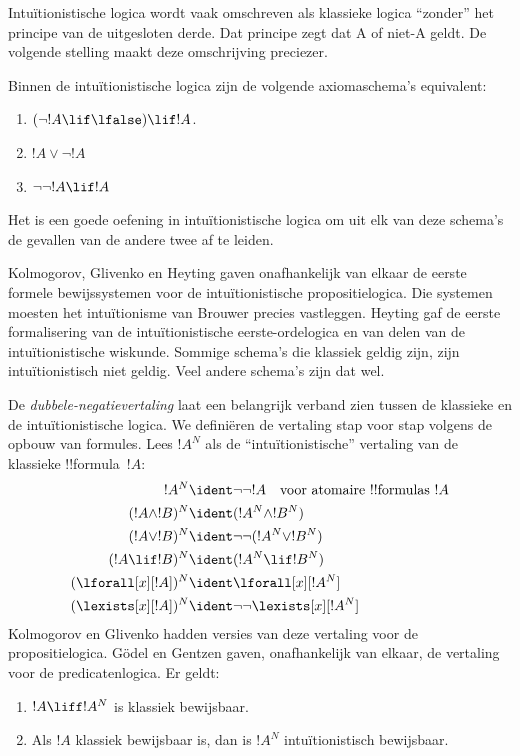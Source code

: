 \documentclass[../../../include/open-logic-section]{subfiles}
\begin{document}
Intuïtionistische logica wordt vaak omschreven als klassieke logica ``zonder''
het principe van de uitgesloten derde. Dat principe zegt dat A of niet-A geldt.
De volgende stelling maakt deze omschrijving preciezer.
\begin{thm}
Binnen de intuïtionistische logica zijn de volgende axiomaschema's equivalent:
\begin{enumerate}
\item $(\lnot !A \lif \lfalse) \lif !A$.
\item $!A \lor \lnot !A$
\item $\lnot \lnot !A \lif !A$
\end{enumerate}
\end{thm}
Het is een goede oefening in intuïtionistische logica om uit elk van deze
schema's de gevallen van de andere twee af te leiden.

Kolmogorov, Glivenko en Heyting gaven onafhankelijk van elkaar de eerste formele
bewijssystemen voor de intuïtionistische propositielogica. Die systemen moesten
het intuïtionisme van Brouwer precies vastleggen. Heyting gaf de eerste
formalisering van de intuïtionistische eerste-ordelogica en van delen van de
intuïtionistische wiskunde. Sommige schema's die klassiek geldig zijn, zijn
intuïtionistisch niet geldig. Veel andere schema's zijn dat wel.

De \emph{dubbele-negatievertaling} laat een belangrijk verband zien tussen de
klassieke en de intuïtionistische logica. We definiëren de vertaling stap voor
stap volgens de opbouw van formules. Lees $!A^N$ als de ``intuïtionistische''
vertaling van de klassieke !!{formula}~$!A$:
\begin{align*}
!A^N & \ident \lnot\lnot !A \quad \text{voor atomaire !!{formula}s $!A$} \\
(!A \land !B)^N & \ident (!A^N \land !B^N) \\
(!A \lor !B)^N & \ident  \lnot\lnot (!A^N \lor !B^N) \\
(!A \lif !B)^N & \ident (!A^N \lif !B^N) \\
(\lforall[x][!A])^N & \ident \lforall[x][!A^N] \\
(\lexists[x][!A])^N & \ident \lnot\lnot\lexists[x][!A^N]
\end{align*}
Kolmogorov en Glivenko hadden versies van deze vertaling voor de
propositielogica. G\"odel en Gentzen gaven, onafhankelijk van elkaar, de
vertaling voor de predicatenlogica. Er geldt:

\begin{thm}
\begin{enumerate}
\item $!A \liff !A^N$ is klassiek bewijsbaar.
\item Als $!A$ klassiek bewijsbaar is, dan is $!A^N$ intuïtionistisch
  bewijsbaar.
\end{enumerate}
\end{thm}
\end{document}
